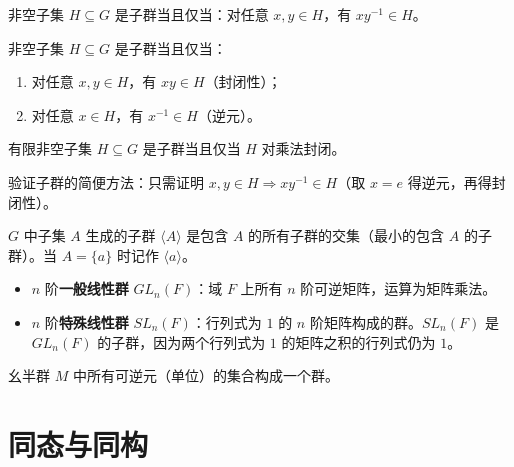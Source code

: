 \begin{theorem}[子群充要条件（定理 1）]
非空子集 $H \subseteq G$ 是子群当且仅当：对任意 $x, y \in H$，有 $xy^{-1} \in H$。
\end{theorem}

\begin{theorem}[子群充要条件（定理 2）]
非空子集 $H \subseteq G$ 是子群当且仅当：
\begin{enumerate}
  \item 对任意 $x, y \in H$，有 $xy \in H$（封闭性）；
  \item 对任意 $x \in H$，有 $x^{-1} \in H$（逆元）。
\end{enumerate}
\end{theorem}

\begin{theorem}[有限子群充要条件（定理 3）]
有限非空子集 $H \subseteq G$ 是子群当且仅当 $H$ 对乘法封闭。
\end{theorem}

\begin{proposition}[命题 1.11]
验证子群的简便方法：只需证明 $x, y \in H \Rightarrow xy^{-1} \in H$（取 $x = e$ 得逆元，再得封闭性）。
\end{proposition}

\begin{definition}[由子集生成的子群]
$G$ 中子集 $A$ 生成的子群 $\langle A \rangle$ 是包含 $A$ 的所有子群的交集（最小的包含 $A$ 的子群）。当 $A = \{a\}$ 时记作 $\langle a \rangle$。
\end{definition}

\begin{definition}[一般线性群与特殊线性群]
\begin{itemize}
  \item $n$ 阶\textbf{一般线性群} $GL_n(F)$：域 $F$ 上所有 $n$ 阶可逆矩阵，运算为矩阵乘法。
  \item $n$ 阶\textbf{特殊线性群} $SL_n(F)$：行列式为 $1$ 的 $n$ 阶矩阵构成的群。$SL_n(F)$ 是 $GL_n(F)$ 的子群，因为两个行列式为 $1$ 的矩阵之积的行列式仍为 $1$。
\end{itemize}
\end{definition}

\begin{lemma}[引理 1.1：幺半群的逆元构成群]
幺半群 $M$ 中所有可逆元（单位）的集合构成一个群。
\end{lemma}

\section{同态与同构}

